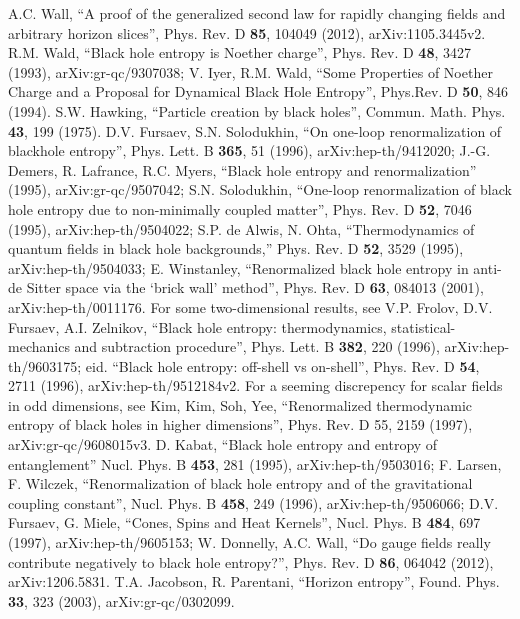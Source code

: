 \documentclass[12pt]{article}
\begin{document}
\begin{thebibliography}{99}
A.C. Wall, ``A proof of the generalized second law for rapidly changing fields and arbitrary horizon slices'', Phys. Rev. D \textbf{85}, 104049 (2012), arXiv:1105.3445v2.
R.M. Wald, ``Black hole entropy is Noether charge'', Phys. Rev. D \textbf{48}, 3427 (1993), arXiv:gr-qc/9307038;
V. Iyer, R.M. Wald, ``Some Properties of Noether Charge and a Proposal for Dynamical Black Hole Entropy'', Phys.Rev. D \textbf{50},  846 (1994).
S.W. Hawking, ``Particle creation by black holes'', Commun. Math. Phys. \textbf{43}, 199 (1975).
D.V. Fursaev, S.N. Solodukhin, ``On one-loop renormalization of blackhole
entropy'', Phys. Lett. B \textbf{365}, 51 (1996), arXiv:hep-th/9412020; 
J.-G. Demers, R. Lafrance, R.C. Myers, ``Black hole entropy and renormalization''
(1995), arXiv:gr-qc/9507042; 
S.N. Solodukhin, ``One-loop renormalization of black hole entropy due to non-minimally coupled matter'', 
Phys. Rev. D \textbf{52}, 7046 (1995), arXiv:hep-th/9504022; 
S.P. de Alwis, N. Ohta, ``Thermodynamics of quantum fields in black hole backgrounds,'' Phys.
Rev. D \textbf{52}, 3529 (1995), arXiv:hep-th/9504033; 
E. Winstanley, ``Renormalized black hole entropy in anti-de Sitter space via the `brick wall' method'',
Phys. Rev. D \textbf{63}, 084013 (2001), arXiv:hep-th/0011176. 
For some two-dimensional results, see V.P. Frolov, D.V. Fursaev, A.I. Zelnikov,
``Black hole entropy: thermodynamics, statistical-mechanics and subtraction
procedure'', Phys. Lett. B \textbf{382}, 220 (1996), arXiv:hep-th/9603175; eid.
``Black hole entropy: off-shell vs on-shell'', Phys. Rev. D \textbf{54}, 2711 (1996),
arXiv:hep-th/9512184v2.
For a seeming discrepency for scalar fields in odd dimensions, see Kim, Kim,
Soh, Yee, ``Renormalized thermodynamic entropy of black holes in higher
dimensions'', Phys. Rev. D 55, 2159 (1997), arXiv:gr-qc/9608015v3. 
D. Kabat, ``Black hole entropy and entropy of entanglement'' Nucl. Phys. B \textbf{453}, 281 (1995), arXiv:hep-th/9503016; 
F. Larsen, F. Wilczek, ``Renormalization of black hole entropy and of the gravitational coupling
constant'', Nucl. Phys. B \textbf{458}, 249 (1996), arXiv:hep-th/9506066; 
D.V. Fursaev, G. Miele, ``Cones, Spins and Heat Kernels'', Nucl. Phys. B \textbf{484}, 697 (1997), arXiv:hep-th/9605153; 
W. Donnelly, A.C. Wall, ``Do gauge fields really contribute negatively to black hole entropy?'', Phys. Rev. D \textbf{86}, 064042 (2012), arXiv:1206.5831.
T.A. Jacobson, R. Parentani, ``Horizon entropy'', Found. Phys. \textbf{33}, 323 (2003), arXiv:gr-qc/0302099.

\end{thebibliography}
\end{document}
